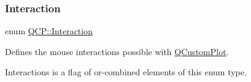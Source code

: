 \mbox{\label{namespace_q_c_p_a2ad6bb6281c7c2d593d4277b44c2b037}} 
\subsubsection{\texorpdfstring{Interaction}{Interaction}\hspace{0.1cm}{\footnotesize\ttfamily [1/2]}}
{\footnotesize\ttfamily enum \hyperlink{namespace_q_c_p_a2ad6bb6281c7c2d593d4277b44c2b037}{Q\+C\+P\+::\+Interaction}}

Defines the mouse interactions possible with \hyperlink{class_q_custom_plot}{Q\+Custom\+Plot}.

{\ttfamily Interactions} is a flag of or-\/combined elements of this enum type.

